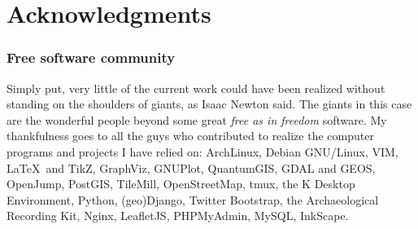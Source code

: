 \chapter*{Acknowledgments}

    \subsection*{Free software community}
        Simply put, very little of the current work could have been realized without standing on the shoulders of giants, as Isaac Newton said. The giants in this case are the wonderful people beyond some great \emph{free as in freedom} software. My thankfulness goes to all the guys who contributed to realize the computer programs and projects I have relied on: ArchLinux, Debian GNU/Linux, VIM, \LaTeX~and TikZ, GraphViz, GNUPlot, QuantumGIS, GDAL and GEOS, OpenJump, PostGIS, TileMill, OpenStreetMap, tmux, the K Desktop Environment, Python, (geo)Django, Twitter Bootstrap, the Archaeological Recording Kit, Nginx, LeafletJS, PHPMyAdmin, MySQL, InkScape.
